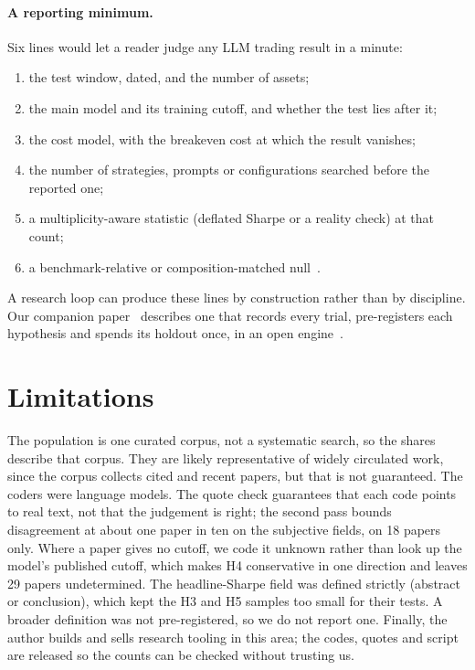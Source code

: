 \documentclass[11pt]{article}
\begin{document}
\paragraph{A reporting minimum.} Six lines would let a reader judge any LLM
trading result in a minute:
\begin{enumerate}[leftmargin=*,itemsep=1pt]
\item the test window, dated, and the number of assets;
\item the main model and its training cutoff, and whether the test lies after it;
\item the cost model, with the breakeven cost at which the result vanishes;
\item the number of strategies, prompts or configurations searched before the
reported one;
\item a multiplicity-aware statistic (deflated Sharpe or a reality check) at that
count;
\item a benchmark-relative or composition-matched null~\cite{chen2026audit}.
\end{enumerate}
A research loop can produce these lines by construction rather than by
discipline. Our companion paper~\cite{zhang2026hardtofool} describes one that
records every trial, pre-registers each hypothesis and spends its holdout once,
in an open engine~\cite{zhang2026engine}.

\section{Limitations}\label{sec:limits}

The population is one curated corpus, not a systematic search, so the shares
describe that corpus. They are likely representative of widely circulated
work, since the corpus collects cited and recent papers, but that is not
guaranteed. The coders were language models. The quote check guarantees that
each code points to real text, not that the judgement is right; the second
pass bounds disagreement at about one paper in ten on the subjective fields,
on 18 papers only. Where a paper gives no cutoff, we code it unknown rather
than look up the model's published cutoff, which makes H4 conservative in one
direction and leaves 29 papers undetermined. The headline-Sharpe field was
defined strictly (abstract or conclusion), which kept the H3 and H5 samples
too small for their tests. A broader definition was not pre-registered, so we
do not report one. Finally, the author builds and sells research tooling in
this area; the codes, quotes and script are released so the counts can be
checked without trusting us.
\end{document}
